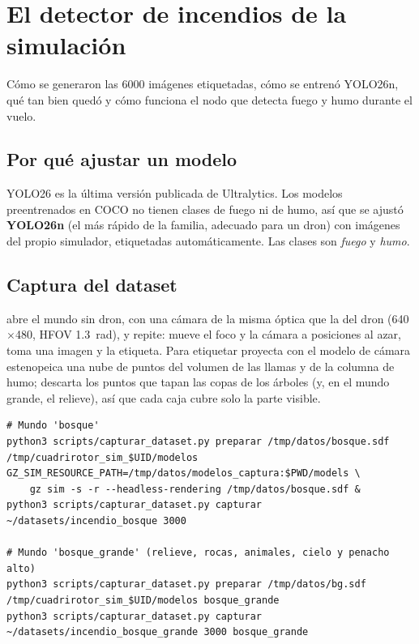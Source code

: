 \chapter{El detector de incendios de la simulación}
\label{cap:yolo-sim}

\begin{enpocas}
Cómo se generaron las 6000 imágenes etiquetadas, cómo se entrenó YOLO26n, qué tan bien quedó y cómo
funciona el nodo que detecta fuego y humo durante el vuelo.
\end{enpocas}

\section{Por qué ajustar un modelo}

YOLO26 es la última versión publicada de Ultralytics. Los modelos preentrenados en COCO no tienen
clases de fuego ni de humo, así que se ajustó \textbf{YOLO26n} (el más rápido de la familia,
adecuado para un dron) con imágenes del propio simulador, etiquetadas automáticamente. Las clases
son \emph{fuego} y \emph{humo}.

\section{Captura del dataset}

 abre el mundo sin dron, con una cámara de la misma óptica que la
del dron (640$\times$480, HFOV 1.3~rad), y repite: mueve el foco y la cámara a posiciones al azar,
toma una imagen y la etiqueta. Para etiquetar proyecta con el modelo de cámara estenopeica una
nube de puntos del volumen de las llamas y de la columna de humo; descarta los puntos que tapan las
copas de los árboles (y, en el mundo grande, el relieve), así que cada caja cubre solo la parte
visible.

\begin{lstlisting}[style=bash]
# Mundo 'bosque'
python3 scripts/capturar_dataset.py preparar /tmp/datos/bosque.sdf /tmp/cuadrirotor_sim_$UID/modelos
GZ_SIM_RESOURCE_PATH=/tmp/datos/modelos_captura:$PWD/models \
    gz sim -s -r --headless-rendering /tmp/datos/bosque.sdf &
python3 scripts/capturar_dataset.py capturar ~/datasets/incendio_bosque 3000

# Mundo 'bosque_grande' (relieve, rocas, animales, cielo y penacho alto)
python3 scripts/capturar_dataset.py preparar /tmp/datos/bg.sdf /tmp/cuadrirotor_sim_$UID/modelos bosque_grande
python3 scripts/capturar_dataset.py capturar ~/datasets/incendio_bosque_grande 3000 bosque_grande
\end{lstlisting}

